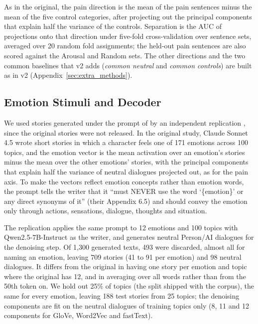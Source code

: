 \documentclass[11pt]{article}
\begin{document}
As in the original, the pain direction is the mean of the pain sentences minus the mean of the five control categories, after projecting out the principal components that explain half the variance of the controls. Separation is the AUC of projections onto that direction under five-fold cross-validation over sentence sets, averaged over 20 random fold assignments; the held-out pain sentences are also scored against the Arousal and Random sets. The other directions and the two common baselines that v2 adds (\emph{common neutral} and \emph{common controls}) are built as in v2 (Appendix~\ref{sec:extra_methods}).

\subsection{Emotion Stimuli and Decoder}
\label{sec:emotion_methods}

We used stories generated under the prompt of \citet{sofroniew2026emotion} by an independent replication \citep{ogunlana2026qwenemotion}, since the original stories were not released. In the original study, Claude Sonnet 4.5 wrote short stories in which a character feels one of 171 emotions across 100 topics, and the emotion vector is the mean activation over an emotion's stories minus the mean over the other emotions' stories, with the principal components that explain half the variance of neutral dialogues projected out, as for the pain axis. To make the vectors reflect emotion concepts rather than emotion words, the prompt tells the writer that it ``must NEVER use the word `\{emotion\}' or any direct synonyms of it'' (their Appendix 6.5) and should convey the emotion only through actions, sensations, dialogue, thoughts and situation.

The replication applies the same prompt to 12 emotions and 100 topics with Qwen2.5-7B-Instruct as the writer, and generates neutral Person/AI dialogues for the denoising step. Of 1{,}300 generated texts, 493 were discarded, almost all for naming an emotion, leaving 709 stories (41 to 91 per emotion) and 98 neutral dialogues. It differs from the original in having one story per emotion and topic where the original has 12, and in averaging over all words rather than from the 50th token on. We hold out 25\% of topics (the split shipped with the corpus), the same for every emotion, leaving 188 test stories from 25 topics; the denoising components are fit on the neutral dialogues of training topics only (8, 11 and 12 components for GloVe, Word2Vec and fastText).
\end{document}
